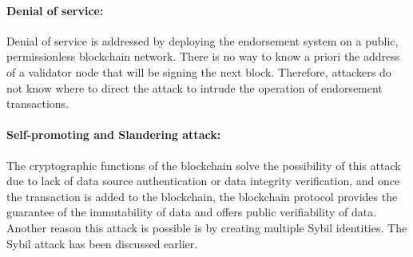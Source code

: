 \paragraph{Denial of service:} Denial of service is addressed by deploying the
endorsement system on a public, permissionless blockchain network. There is no
way to know a priori the address of a validator node that will be signing the
next block. Therefore, attackers do not know where to direct the attack to
intrude the operation of endorsement transactions. 
\paragraph{Self-promoting and Slandering attack:}The cryptographic functions of
the blockchain solve the possibility of this attack due to lack of data source
authentication or data integrity verification, and once the transaction is
added to the blockchain, the blockchain protocol provides the guarantee of the
immutability of data and offers public verifiability of data. Another reason
this attack is possible is by creating multiple Sybil identities. The Sybil
attack has been discussed earlier. 
